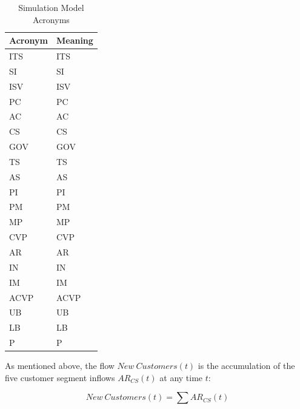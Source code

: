 \begin{table}[t]
	\centering
	\begin{tabular}{ll}
			\toprule 
			\footnotesize \textbf{Acronym} & \footnotesize \textbf{Meaning}	 \\ \midrule
			\footnotesize \acs{ITS} & \footnotesize \acl{ITS}\\
			\footnotesize \acs{SI} & \footnotesize \acl{SI}\\
			\footnotesize \acs{ISV} & \footnotesize \acl{ISV}\\
			\footnotesize \acs{PC} & \footnotesize \acl{PC}\\
			\footnotesize \acs{AC} & \footnotesize \acl{AC}\\ 
			\footnotesize \acs{CS} & \footnotesize \acl{CS}\\ \midrule
			\footnotesize \acs{GOV} & \footnotesize \acl{GOV}\\
			\footnotesize \acs{TS} & \footnotesize \acl{TS}\\
			\footnotesize \acs{AS} & \footnotesize \acl{AS}\\ \midrule
			\footnotesize \acs{PI} & \footnotesize \acl{PI}\\
			\footnotesize \acs{PM} & \footnotesize \acl{PM}\\
			\footnotesize \acs{MP} & \footnotesize \acl{MP}\\ \midrule
			\footnotesize \acs{CVP} & \footnotesize \acl{CVP}\\
			\footnotesize \acs{AR} & \footnotesize \acl{AR} \\ 
			\footnotesize \acs{IN} & \footnotesize \acl{IN} \\ 
			\footnotesize \acs{IM} & \footnotesize \acl{IM} \\ 
			\footnotesize \acs{ACVP} & \footnotesize \acl{ACVP} \\ 
			\footnotesize \acs{UB} & \footnotesize \acl{UB} \\
			\footnotesize \acs{LB} & \footnotesize \acl{LB}\\
			\footnotesize \acs{P} & \footnotesize \acl{P}\\ \bottomrule
	\end{tabular}
	\caption{Simulation Model Acronyms}
	\label{tab:acro}
\end{table}

As mentioned above, the flow $New~Customers(t)$ is the accumulation of the five customer segment inflows $AR_{CS}(t)$ at any time $t$:

\begin{equation}\label{eq:nc}
	\mathit{New~Customers(t)} = \sum AR_{CS}(t)
\end{equation}

